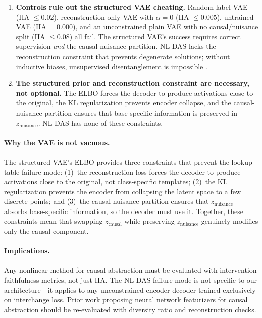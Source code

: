 \documentclass{article}
\begin{document}
\begin{enumerate}[leftmargin=*]
\item \textbf{Controls rule out the structured VAE cheating.} Random-label VAE
  (IIA $\leq 0.02$), reconstruction-only VAE with $\alpha = 0$
  (IIA $\leq 0.005$), untrained VAE (IIA = 0.000), and an unconstrained plain
  VAE with no causal/nuisance split (IIA $\leq 0.08$) all fail. The structured
  VAE's success requires correct supervision \emph{and} the
  causal-nuisance partition. NL-DAS lacks the reconstruction constraint
  that prevents degenerate solutions; without inductive biases, unsupervised
  disentanglement is impossible \citep{locatello2019challenging}.

\item \textbf{The structured prior and reconstruction constraint are
  necessary, not optional.} The ELBO forces the decoder to produce
  activations close to the original, the KL regularization prevents
  encoder collapse, and the causal-nuisance partition ensures that
  base-specific information is preserved in $z_\text{nuisance}$.
  NL-DAS has none of these constraints.
\end{enumerate}

\paragraph{Why the VAE is not vacuous.}
The structured VAE's ELBO provides three constraints that prevent the
lookup-table failure mode: (1)~the reconstruction loss forces the decoder to
produce activations close to the original, not class-specific templates;
(2)~the KL regularization prevents the encoder from collapsing the latent space
to a few discrete points; and (3)~the causal-nuisance partition ensures that
$z_\text{nuisance}$ absorbs base-specific information, so the decoder must use
it. Together, these constraints mean that swapping $z_\text{causal}$ while
preserving $z_\text{nuisance}$ genuinely modifies only the causal component.

\paragraph{Implications.}
Any nonlinear method for causal abstraction must be evaluated with intervention
faithfulness metrics, not just IIA. The NL-DAS failure mode is not specific to
our architecture---it applies to any unconstrained encoder-decoder trained
exclusively on interchange loss. Prior work proposing neural network featurizers
for causal abstraction \citep{geiger2024causal} should be re-evaluated with
diversity ratio and reconstruction checks.
\end{document}
